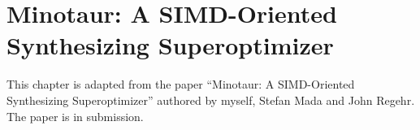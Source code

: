 \chapter{Minotaur: A SIMD-Oriented Synthesizing Superoptimizer}
\label{chap:minotaur}

This chapter is adapted from the paper ``Minotaur: A SIMD-Oriented
Synthesizing Superoptimizer'' authored by myself, Stefan Mada and John
Regehr. The paper is in submission.







